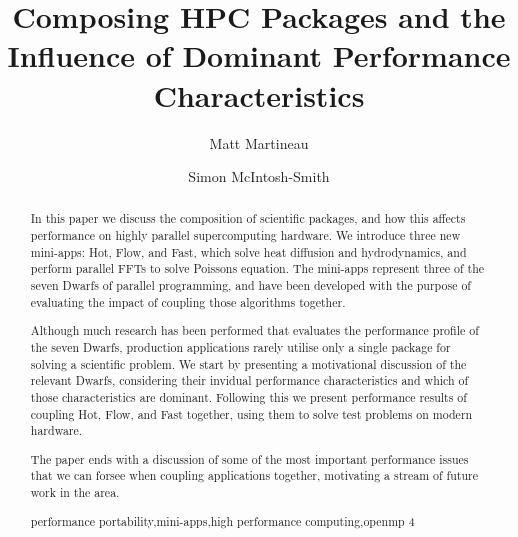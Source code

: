 \documentclass[runningheads,a4paper]{llncs}
\newcommand{\keywords}[1]{\par\addvspace\baselineskip
\noindent\keywordname\enspace\ignorespaces#1}
\begin{document}
\mainmatter  %

\title{Composing HPC Packages and the Influence of Dominant Performance Characteristics}


\author{Matt Martineau \and Simon McIntosh-Smith}
%


%
%

\maketitle


\begin{abstract}
  In this paper we discuss the composition of scientific packages, and how this affects performance on highly parallel supercomputing hardware. We introduce three new mini-apps: Hot, Flow, and Fast, which solve heat diffusion and hydrodynamics, and perform parallel FFTs to solve Poissons equation. The mini-apps represent three of the seven Dwarfs of parallel programming, and have been developed with the purpose of evaluating the impact of coupling those algorithms together.

  Although much research has been performed that evaluates the performance profile of the seven Dwarfs, production applications rarely utilise only a single package for solving a scientific problem. We start by presenting a motivational discussion of the relevant Dwarfs, considering their invidual performance characteristics and which of those characteristics are dominant. Following this we present performance results of coupling Hot, Flow, and Fast together, using them to solve test problems on modern hardware.  

  The paper ends with a discussion of some of the most important performance issues that we can forsee when coupling applications together, motivating a stream of future work in the area.

  \keywords{performance portability,mini-apps,high performance computing,openmp 4}
\end{abstract}
\end{document}
